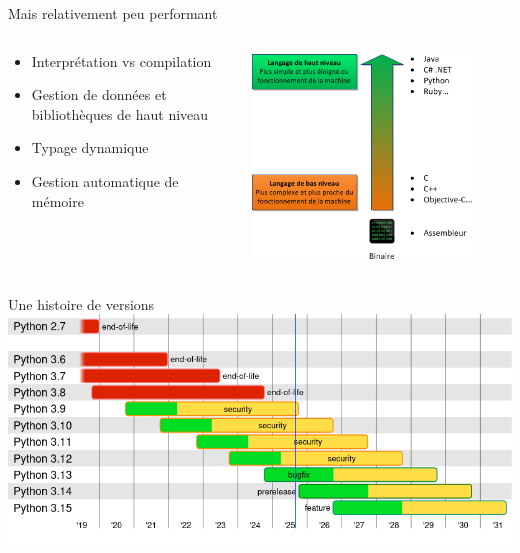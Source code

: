 \begin{frame}{Mais relativement peu performant}

  \begin{columns}[T]
    \begin{column}{.6\textwidth}
      \begin{block}{}
        \begin{itemize}
          \item<+-> Interprétation vs compilation
          \item<+-> Gestion de données et bibliothèques de haut niveau
          \item<+-> Typage dynamique
          \item<+-> Gestion automatique de mémoire
        \end{itemize}
      \end{block}
    \end{column}%
    \hfill
    \begin{column}{.4\textwidth}
      \includegraphics[width=0.85\textwidth]{img/abstraction}
    \end{column}%
  \end{columns}

\end{frame}







\begin{frame}{Une histoire de versions}
  \centering
  \includegraphics[width=1.\textwidth]{img/python-versions.png}
\end{frame}



